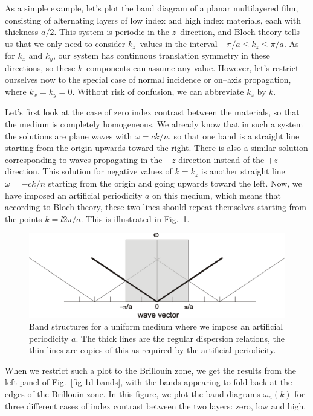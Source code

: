 As a simple example, let's plot the band diagram of a planar multilayered film, consisting of alternating layers of low index and high index materials, each with thickness $a/2$. This system is periodic in the $z$--direction, and Bloch theory tells us that we only need to consider $k_z$--values in the interval $-\pi / a \le k_z \le \pi / a$. As for $k_x$ and $k_y$, our system has continuous translation symmetry in these directions, so these $k$--components can assume any value. However, let's restrict ourselves now to the special case of normal incidence or on--axis propagation, where $k_x=k_y=0$. Without risk of confusion, we can abbreviate $k_z$ by $k$.

Let's first look at the case of zero index contrast between the materials, so that the medium is completely homogeneous. We already know that in such a system the solutions are plane waves with $\omega = c k / n$, so that one band is a straight line starting from the origin upwards toward the right. There is also a similar solution corresponding to waves propagating in the $-z$ direction instead of the $+z$ direction. This solution for negative values of $k=k_z$ is another straight line $\omega = - c k / n$ starting from the origin and going upwards toward the left. Now, we have imposed an artificial periodicity $a$ on this medium, which means that according to Bloch theory, these two lines should repeat themselves starting from the points $k = l 2 \pi / a$. This is illustrated in Fig.~\ref{fig-1d-bands-uniform}.

\begin{figure}
\centering
\includegraphics{periodic/figures/band_folding_uniform}
\caption{Band structures for a uniform medium where we impose an artificial periodicity $a$. The thick lines are the regular dispersion relations, the thin lines are copies of this as required by the artificial periodicity.}
\label{fig-1d-bands-uniform}
\end{figure}

When we restrict such a plot to the Brillouin zone, we get the results from the left panel of Fig.~\ref{fig-1d-bands}, with the bands appearing to fold back at the edges of the Brillouin zone. In this figure, we plot the band diagrams $\omega_n(k)$ for three different cases of index contrast between the two layers: zero, low and high.

